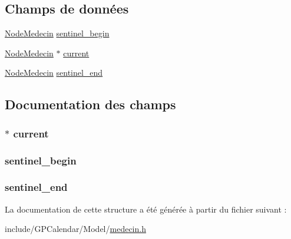 \subsection*{Champs de données}
\begin{DoxyCompactItemize}
\item 
\hyperlink{struct_node_medecin}{Node\-Medecin} \hyperlink{struct_list_medecin_a1bbeb88d0dd5cfca362bc969a3771420}{sentinel\-\_\-begin}
\item 
\hyperlink{struct_node_medecin}{Node\-Medecin} $\ast$ \hyperlink{struct_list_medecin_a8da16810fc962b178bf6e06873609e0f}{current}
\item 
\hyperlink{struct_node_medecin}{Node\-Medecin} \hyperlink{struct_list_medecin_af3ae3b9febe4f1a4962f472064f963b6}{sentinel\-\_\-end}
\end{DoxyCompactItemize}


\subsection{Documentation des champs}
\hypertarget{struct_list_medecin_a8da16810fc962b178bf6e06873609e0f}{
\subsubsection[{current}]{$\ast$ current}}\label{struct_list_medecin_a8da16810fc962b178bf6e06873609e0f}
\hypertarget{struct_list_medecin_a1bbeb88d0dd5cfca362bc969a3771420}{
\subsubsection[{sentinel\-\_\-begin}]{ sentinel\-\_\-begin}}\label{struct_list_medecin_a1bbeb88d0dd5cfca362bc969a3771420}
\hypertarget{struct_list_medecin_af3ae3b9febe4f1a4962f472064f963b6}{
\subsubsection[{sentinel\-\_\-end}]{ sentinel\-\_\-end}}\label{struct_list_medecin_af3ae3b9febe4f1a4962f472064f963b6}


La documentation de cette structure a été générée à partir du fichier suivant \-:\begin{DoxyCompactItemize}
\item 
include/\-G\-P\-Calendar/\-Model/\hyperlink{medecin_8h}{medecin.\-h}\end{DoxyCompactItemize}
